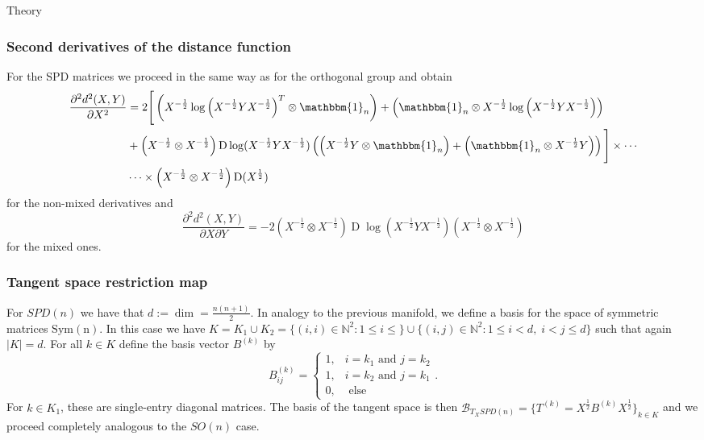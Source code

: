 \begin{chapter}{Theory}
\subsubsection{Second derivatives of the distance function} %
\label{ssub:SecondDerSPD}
For the SPD matrices we proceed in the same way as for the orthogonal group and obtain
\begin{align}
    \label{eq:spd_xx_der}
    \frac{\partial^2 d^2(X,Y)}{\partial X^2} &= 
    2\Bigg[
	\left(X^{-\frac{1}{2}}\log\left(X^{-\frac{1}{2}}YX^{-\frac{1}{2}}\right)^T\otimes\mathbbm{1}_n\right)
	+\left(\mathbbm{1}_n\otimes X^{-\frac{1}{2}}\log\left(X^{-\frac{1}{2}}YX^{-\frac{1}{2}}\right)\right) \\
    &	+\left(X^{-\frac{1}{2}}\otimes X^{-\frac{1}{2}}\right)\operatorname{D}\log(X^{-\frac{1}{2}}YX^{-\frac{1}{2}})\left( \left(X^{-\frac{1}{2}}Y\otimes\mathbbm{1}_n\right)
	+ \left(\mathbbm{1}_n\otimes X^{-\frac{1}{2}}Y\right)\right) 
    \Bigg] \times\cdots \nonumber \\
    & \cdots\times\left(X^{-\frac{1}{2}}\otimes X^{-\frac{1}{2}}\right)\operatorname{D}(X^{\frac{1}{2}})\nonumber
\end{align}
for the non-mixed derivatives and
\begin{equation}
    \label{eq:spd_xy_der}
    \frac{\partial^2 d^2(X,Y)}{\partial X\partial Y} = -2\left(X^{-\frac{1}{2}}\otimes X^{-\frac{1}{2}}\right)\operatorname{D}\log\left(X^{-\frac{1}{2}}Y X^{-\frac{1}{2}}\right)\left(X^{-\frac{1}{2}}\otimes X^{-\frac{1}{2}}\right)
\end{equation}
for the mixed ones.

\subsubsection{Tangent space restriction map} %
\label{ssub:TangentSPD}
For $SPD(n)$ we have that $d:=\operatorname{dim}=\frac{n(n+1)}{2}$. In analogy to the previous manifold, we define a basis for the space of symmetric matrices 
$\operatorname{Sym(n)}$. In this case we have $K= K_1\cup K_2=\lbrace (i,i)\in\mathbb{N}^2: 1\leq i\leq\rbrace \cup \lbrace (i,j)\in\mathbb{N}^2: 1\leq i < d,\; i < j \leq d  \rbrace$
such that again $|K|=d$. For all $k\in K$ define the basis vector $B^{(k)}$ by 
\begin{equation}
    B^{(k)}_{ij}=\begin{cases}
	1, & i=k_1 \text{ and } j=k_2\\
	1, & i=k_2 \text{ and } j=k_1\\
	0, & \text{ else }
    \end{cases}.
\end{equation}
For $k\in K_1$, these are single-entry diagonal matrices.
The basis of the tangent space is then $\mathcal{B}_{T_XSPD(n)}=\lbrace T^{(k)} = X^{\frac{1}{2}}B^{(k)}X^{\frac{1}{2}} \rbrace_{k\in K}$ and we proceed completely analogous to the $SO(n)$ case.


\end{chapter}
